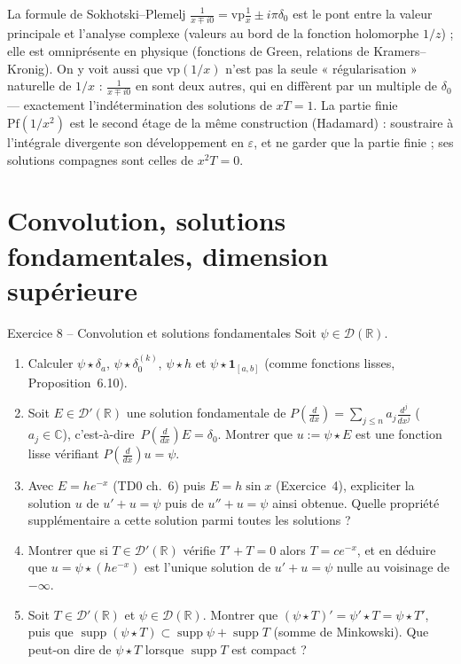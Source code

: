 \documentclass[11pt,a4paper]{article}
\newcommand{\R}{\mathbb{R}}
\newcommand{\C}{\mathbb{C}}
\newcommand{\ie}{c'est-à-dire}
\DeclareMathOperator{\supp}{supp}
\newcommand{\D}{\mathcal{D}}
\theoremstyle{definition}
\begin{document}
\begin{commentaire}
La formule de Sokhotski--Plemelj $\frac1{x\mp i0}=\mathrm{vp}\frac1x\pm i\pi\delta_0$ est le pont entre la valeur principale et l'analyse complexe (valeurs au bord de la fonction holomorphe $1/z$) ; elle est omniprésente en physique (fonctions de Green, relations de Kramers--Kronig). On y voit aussi que $\mathrm{vp}(1/x)$ n'est pas la seule « régularisation » naturelle de $1/x$ : $\frac1{x\mp i0}$ en sont deux autres, qui en diffèrent par un multiple de $\delta_0$ — exactement l'indétermination des solutions de $xT=1$. La partie finie $\mathrm{Pf}(1/x^2)$ est le second étage de la même construction (Hadamard) : soustraire à l'intégrale divergente son développement en $\varepsilon$, et ne garder que la partie finie ; ses solutions compagnes sont celles de $x^2T=0$.
\end{commentaire}

\section*{Convolution, solutions fondamentales, dimension supérieure}

\begin{exo}{Exercice 8 -- Convolution et solutions fondamentales}
Soit $\psi\in\D(\R)$.
\begin{enumerate}[label=(\alph*)]
  \item Calculer $\psi\star\delta_a$, $\psi\star\delta_0^{(k)}$, $\psi\star h$ et $\psi\star\mathbf 1_{[a,b]}$ (comme fonctions lisses, Proposition~6.10).
  \item Soit $E\in\D'(\R)$ une solution fondamentale de $P(\frac d{dx})=\sum_{j\le n}a_j\frac{d^j}{dx^j}$ ($a_j\in\C$), \ie\ $P(\frac d{dx})E=\delta_0$. Montrer que $u:=\psi\star E$ est une fonction lisse vérifiant $P(\frac d{dx})u=\psi$.
  \item Avec $E=he^{-x}$ (TD0 ch.~6) puis $E=h\sin x$ (Exercice~4), expliciter la solution $u$ de $u'+u=\psi$ puis de $u''+u=\psi$ ainsi obtenue. Quelle propriété supplémentaire a cette solution parmi toutes les solutions ?
  \item Montrer que si $T\in\D'(\R)$ vérifie $T'+T=0$ alors $T=ce^{-x}$, et en déduire que $u=\psi\star(he^{-x})$ est l'unique solution de $u'+u=\psi$ nulle au voisinage de $-\infty$.
  \item Soit $T\in\D'(\R)$ et $\psi\in\D(\R)$. Montrer que $(\psi\star T)'=\psi'\star T=\psi\star T'$, puis que $\supp(\psi\star T)\subset\supp\psi+\supp T$ (somme de Minkowski). Que peut-on dire de $\psi\star T$ lorsque $\supp T$ est compact ?
\end{enumerate}
\end{exo}
\end{document}
